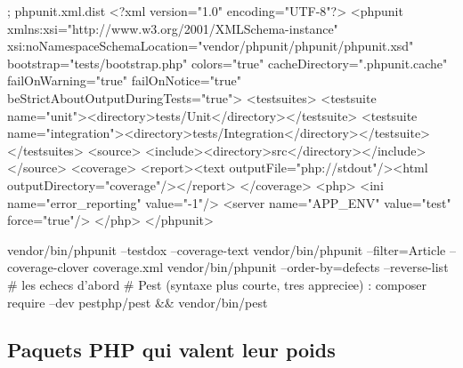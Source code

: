 \begin{codeconf}
; phpunit.xml.dist
<?xml version="1.0" encoding="UTF-8"?>
<phpunit xmlns:xsi="http://www.w3.org/2001/XMLSchema-instance"
         xsi:noNamespaceSchemaLocation="vendor/phpunit/phpunit/phpunit.xsd"
         bootstrap="tests/bootstrap.php" colors="true" cacheDirectory=".phpunit.cache"
         failOnWarning="true" failOnNotice="true" beStrictAboutOutputDuringTests="true">
  <testsuites>
    <testsuite name="unit"><directory>tests/Unit</directory></testsuite>
    <testsuite name="integration"><directory>tests/Integration</directory></testsuite>
  </testsuites>
  <source>
    <include><directory>src</directory></include>
  </source>
  <coverage>
    <report><text outputFile="php://stdout"/><html outputDirectory="coverage"/></report>
  </coverage>
  <php>
    <ini name="error_reporting" value="-1"/>
    <server name="APP_ENV" value="test" force="true"/>
  </php>
</phpunit>
\end{codeconf}

\begin{terminal}
vendor/bin/phpunit --testdox --coverage-text
vendor/bin/phpunit --filter=Article --coverage-clover coverage.xml
vendor/bin/phpunit --order-by=defects --reverse-list    # les echecs d'abord
# Pest (syntaxe plus courte, tres appreciee) : composer require --dev pestphp/pest && vendor/bin/pest
\end{terminal}

\subsection{Paquets PHP qui valent leur poids}

